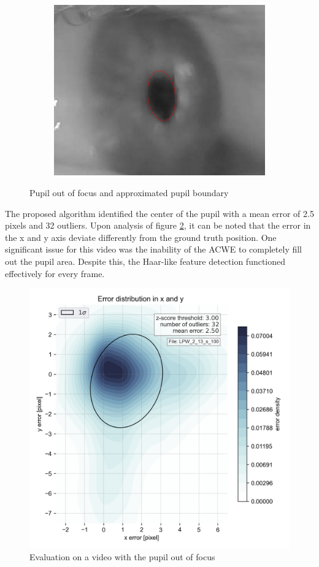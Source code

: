 \begin{figure}[h]
\begin{subfigure}{0.4\textwidth}
    \end{subfigure}
    \begin{subfigure}{0.4\textwidth}
        \centering
        \includegraphics[width=0.8\linewidth]{plots/acwe/resultblurred2.png} 
    \end{subfigure}
\caption{Pupil out of focus and approximated pupil boundary}
\label{fig:blurred_vid}
\end{figure}
The proposed algorithm identified the center of the pupil with a mean error of 2.5 pixels and 32 outliers. Upon analysis of figure \ref{fig:blurred_eval}, it can be noted that the error in the x and y axis deviate differently from the ground truth position. One significant issue for this video was the inability of the ACWE to completely fill out the pupil area. Despite this, the Haar-like feature detection functioned effectively for every frame. 
\begin{figure}[h]
    \centering
    \includegraphics[width=0.9\linewidth]{plots/LPW_2_13_s_100.png} 
\caption{Evaluation on a video with the pupil out of focus}
\label{fig:blurred_eval}
\end{figure}

